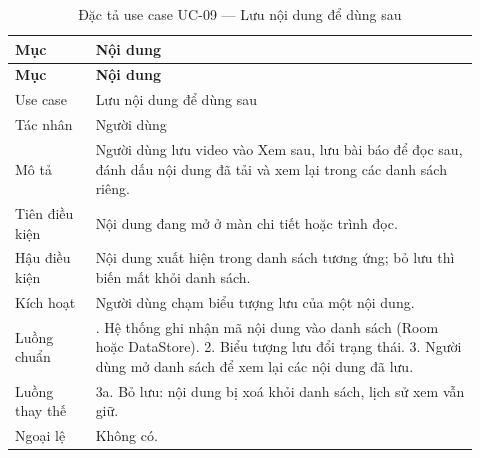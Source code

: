 \begingroup\small\renewcommand{\arraystretch}{1.15}\setlength{\tabcolsep}{3pt}
\begin{longtable}{>{\RaggedRight\arraybackslash}p{0.16\linewidth}>{\RaggedRight\arraybackslash}p{0.76\linewidth}}
\caption{Đặc tả use case UC-09 --- Lưu nội dung để dùng sau}
\label{tab:spec-uc-09}\\
\toprule
\textbf{Mục} & \textbf{Nội dung} \\
\midrule
\endfirsthead
\toprule
\textbf{Mục} & \textbf{Nội dung} \\
\midrule
\endhead
\bottomrule
\endfoot
Use case & Lưu nội dung để dùng sau \\
Tác nhân & Người dùng \\
Mô tả & Người dùng lưu video vào Xem sau, lưu bài báo để đọc sau, đánh dấu nội dung đã tải và xem lại trong các danh sách riêng. \\
Tiên điều kiện & Nội dung đang mở ở màn chi tiết hoặc trình đọc. \\
Hậu điều kiện & Nội dung xuất hiện trong danh sách tương ứng; bỏ lưu thì biến mất khỏi danh sách. \\
Kích hoạt & Người dùng chạm biểu tượng lưu của một nội dung. \\
Luồng chuẩn & 1. Hệ thống ghi nhận mã nội dung vào danh sách (Room hoặc DataStore). 2. Biểu tượng lưu đổi trạng thái. 3. Người dùng mở danh sách để xem lại các nội dung đã lưu. \\
Luồng thay thế & 3a. Bỏ lưu: nội dung bị xoá khỏi danh sách, lịch sử xem vẫn giữ. \\
Ngoại lệ & Không có. \\
\end{longtable}
\endgroup

